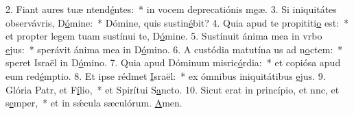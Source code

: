 2. Fiant aures tuæ ntend\uline{é}ntes:~* in vocem deprecatiónis m\uline{e}æ.
3. Si iniquitátes observávris, D\uline{ó}mine:~* Dómine, quis sustin\uline{é}bit?
4. Quia apud te propititi\uline{o} est:~* et propter legem tuam sustínui te, D\uline{ó}mine.
5. Sustínuit ánima mea in vrbo \uline{e}jus:~* sperávit ánima mea in D\uline{ó}mino.
6. A custódia matutína us ad n\uline{o}ctem:~* speret Israël in D\uline{ó}mino.
7. Quia apud Dóminum misric\uline{ó}rdia:~* et copiósa apud eum red\uline{é}mptio.
8. Et ipse rédmet \uline{I}sraël:~* ex ómnibus iniquitátibus \uline{e}jus.
9. Glória Patr, et F\uline{í}lio,~* et Spirítui S\uline{a}ncto.
10. Sicut erat in princípio, et nnc, et s\uline{e}mper,~* et in sǽcula sæculórum. \uline{A}men.
